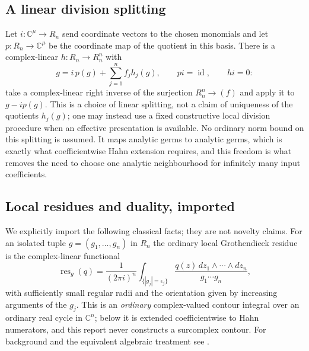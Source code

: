 \documentclass[11pt,letterpaper]{article}
\theoremstyle{definition}
\theoremstyle{remark}
\newcommand{\C}{\mathbb C}
\newcommand{\res}{\operatorname{res}}
\newcommand{\id}{\operatorname{id}}
\numberwithin{equation}{section}
\begin{document}
\subsection{A linear division splitting}\label{analytic:subsec:splitting}
Let $i:\C^\mu\to R_n$ send coordinate vectors to the chosen monomials and
let $p:R_n\to\C^\mu$ be the coordinate map of the quotient in this basis.
There is a complex-linear $h:R_n\to R_n^n$ with
\begin{equation}\label{analytic:eq:splitting}
 g=i\,p(g)+\sum_{j=1}^nf_jh_j(g),\qquad pi=\id,\qquad hi=0 :
\end{equation}
take a complex-linear right inverse of the surjection $R_n^n\to(f)$ and
apply it to $g-ip(g)$. This is a choice of linear splitting, not a claim of
uniqueness of the quotients $h_j(g)$; one may instead use a fixed
constructive local division procedure when an effective presentation is
available. No ordinary norm bound on this splitting is assumed. It maps
analytic germs to analytic germs, which is exactly what coefficientwise Hahn
extension requires, and this freedom is what removes the need to choose one
analytic neighbourhood for infinitely many input coefficients.

\subsection{Local residues and duality, imported}
\label{analytic:subsec:classical-residue}
We explicitly import the following classical facts; they are not novelty
claims. For an isolated tuple $g=(g_1,\ldots,g_n)$ in $R_n$ the ordinary
local Grothendieck residue is the complex-linear functional
\begin{equation}\label{analytic:eq:classical-residue}
 \res_g(q)=\frac1{(2\pi i)^n}\int_{\{|g_j|=\epsilon_j\}}
 \frac{q(z)\,dz_1\wedge\cdots\wedge dz_n}{g_1\cdots g_n},
\end{equation}
with sufficiently small regular radii and the orientation given by
increasing arguments of the $g_j$. This is an \emph{ordinary}
complex-valued contour integral over an ordinary real cycle in $\C^n$;
below it is extended coefficientwise to Hahn numerators, and this report
never constructs a surcomplex contour. For background and the equivalent
algebraic treatment see \cite{Tsikh,SS,CDS,GH}.
\end{document}
